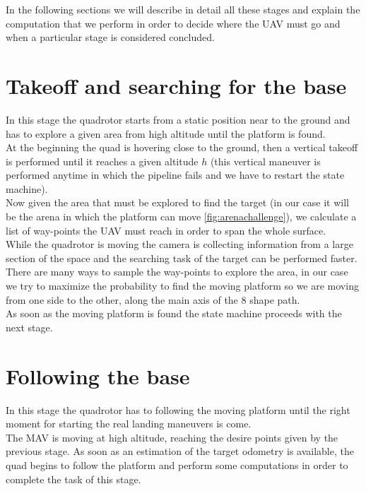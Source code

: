 In the following sections we will describe in detail all these stages and explain the computation that we perform in order to decide where the UAV must go and when a particular stage is considered concluded.


\section{Takeoff and searching for the base}
In this stage the quadrotor starts from a static position near to the ground and has to explore a given area from high altitude until the platform is found.\\

At the beginning the quad is hovering close to the ground, then a vertical takeoff is performed until it reaches a given altitude $h$ (this vertical maneuver is performed anytime in which the pipeline fails and we have to restart the state machine).\\
Now given the area that must be explored to find the target (in our case it will be the arena in which the platform can move \ref{fig:arenachallenge}), we calculate a list of way-points the UAV must reach in order to span the whole surface.\\
While the quadrotor is moving the camera is collecting information from a large section of the space and the searching task of the target can be performed faster.\\
There are many ways to sample the way-points to explore the area, in our case we try to maximize the probability to find the moving platform so we are moving from one side to the other, along the main axis of the 8 shape path.\\

As soon as the moving platform is found the state machine proceeds with the next stage.

\section{Following the base}
In this stage the quadrotor has to following the moving platform until the right moment for starting the real landing maneuvers is come.\\

The MAV is moving at high altitude, reaching the desire points given by the previous stage.  As soon as an estimation of the target odometry is available, the quad begins to follow the platform and perform some computations in order to complete the task of this stage.

